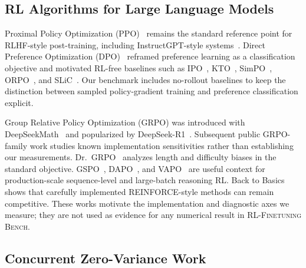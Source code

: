 \documentclass{article}
\newcommand{\ours}{\textsc{RL-Finetuning Bench}}
\begin{document}
\subsection{RL Algorithms for Large Language Models}
\label{sec:related:algos}

Proximal Policy Optimization (PPO)~\cite{schulman2017proximal} remains the
standard reference point for RLHF-style post-training, including
InstructGPT-style systems~\cite{ouyang2022training, christiano2017deeprlhf,
stiennon2020summarize, bai2022hhrlhf, bai2022claudecai}. Direct Preference
Optimization (DPO)~\cite{rafailov2024direct} reframed preference learning as a
classification objective and motivated RL-free baselines such as
IPO~\cite{azar2024ipo}, KTO~\cite{ethayarajh2024kto},
SimPO~\cite{meng2024simpo}, ORPO~\cite{hong2024orpo}, and
SLiC~\cite{zhao2023slic}. Our benchmark includes no-rollout baselines to keep
the distinction between sampled policy-gradient training and preference
classification explicit.

Group Relative Policy Optimization (GRPO) was introduced with
DeepSeekMath~\cite{shao2024deepseekmath} and popularized by
DeepSeek-R1~\cite{guo2025deepseekr1, guo2025deepseekr1nature}. Subsequent
public GRPO-family work studies known implementation sensitivities rather than
establishing our measurements. Dr.~GRPO~\cite{tong2025drgrpo} analyzes length
and difficulty biases in the standard objective. GSPO~\cite{qwen2025gspo},
DAPO~\cite{yu2025dapo}, and VAPO~\cite{bytedance2025vapo} are useful context
for production-scale sequence-level and large-batch reasoning RL. Back to
Basics~\cite{ahmadian2024backtobasics} shows that carefully implemented
REINFORCE-style methods can remain competitive. These works motivate the
implementation and diagnostic axes we measure; they are not used as evidence
for any numerical result in \ours{}.

\subsection{Concurrent Zero-Variance Work}
\label{sec:related:concurrent-zv}
\end{document}
